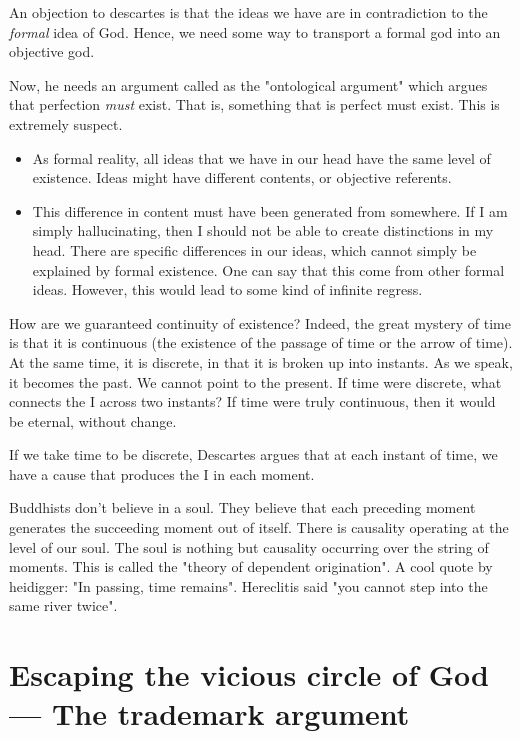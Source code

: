 \documentclass[11pt]{book}
\begin{document}
An objection to descartes is that the ideas we have are in contradiction to the
\textit{formal} idea of God. Hence, we need some way to transport a formal god
into an objective god.

Now, he needs an argument called as the "ontological argument" which argues
that perfection \textit{must} exist.  That is, something that is perfect must
exist. This is extremely suspect.

\begin{itemize}
    \item As formal reality, all ideas that we have in our head have the same
    level of existence.  Ideas might have different contents, or objective
    referents.  
    
    \item This difference in content must have been generated from
    somewhere. If I am simply hallucinating, then I should not be able to
    create distinctions in my head.  There are specific differences in our
    ideas, which cannot simply be explained by formal existence. One can say
    that this come from other formal ideas. However, this would lead to some
    kind of infinite regress.
\end{itemize}


How are we guaranteed continuity of existence? Indeed, the great mystery of
time is that it is continuous (the existence of the passage of time or the
arrow of time).  At the same time, it is discrete,  in that it is broken up
into instants. As we speak, it becomes the past. We cannot point to the
present. If time were discrete, what connects the I across two instants?
If time were truly continuous, then it would be eternal, without change.


If we take time to be discrete, Descartes argues that at each instant of time,
we have a cause that produces the I in each moment. 

Buddhists don't believe in a soul. They believe that each preceding moment 
generates the succeeding moment out of itself. There is causality operating
at the level of our soul. The soul is nothing but causality occurring over
the string of moments. This is called the "theory of dependent origination".
A cool quote by heidigger: "In passing, time remains". Hereclitis said "you
cannot step into the same river twice".


\section{Escaping the vicious circle of God --- The trademark argument}
\end{document}
